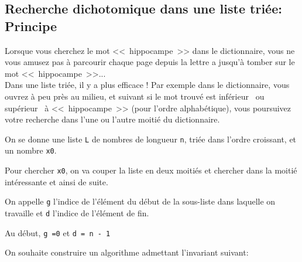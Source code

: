\subsection{Recherche dichotomique dans une liste     {triée}: Principe}

Lorsque vous cherchez le mot <<~hippocampe~>> dans le dictionnaire, vous ne vous amusez pas à parcourir chaque page depuis la lettre a jusqu'à tomber sur le mot <<~hippocampe~>>...\\
Dans une liste triée, il y a plus efficace ! Par exemple dans le dictionnaire, vous ouvrez à peu près au milieu, et suivant si le mot trouvé est \og inférieur \fg \ ou \og supérieur \fg \ à <<~hippocampe~>> (pour l'ordre alphabétique), vous poursuivez votre recherche dans l'une ou l'autre moitié du dictionnaire.


\begin{prop}
On se donne une liste \texttt{L} de nombres de longueur \texttt{n},     {triée dans l'ordre croissant}, et un nombre \texttt{x0}. 

Pour chercher \texttt{x0}, on va couper la liste en deux moitiés et chercher dans la moitié intéressante et ainsi de suite.

On appelle \texttt{g}     {l'indice} de l'élément du début de la sous-liste dans laquelle on travaille et \texttt{d}     {l'indice} de l'élément de fin.

Au début, \texttt{g =0} et \texttt{d = n - 1} 

On souhaite construire un algorithme admettant l'invariant suivant:
\bigskip

\centerline{}
\end{prop}




